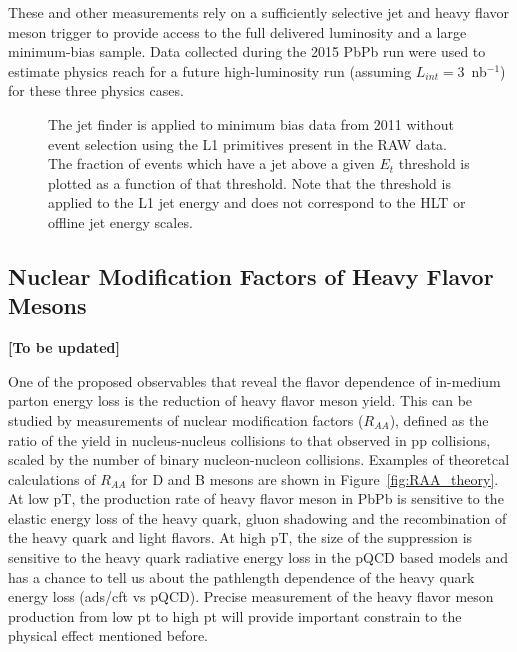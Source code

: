 These and other measurements rely on a sufficiently selective jet and heavy flavor meson trigger to provide access to the 
full delivered luminosity and a large minimum-bias sample.  Data collected during the 2015 PbPb run were used to estimate physics reach  
for a future high-luminosity run (assuming $L_{int} =$3~nb$^{-1}$) for these three physics cases. 

\begin{figure}[!ht]
\begin{center}
\caption{The jet finder is applied to minimum bias data from 2011 without
event selection using the L1 primitives present in the RAW data. The
fraction of events which have a jet above a given $E_t$ threshold is plotted
as a function of that threshold. Note that the threshold is applied to the
L1 jet energy and does not correspond to the HLT or offline jet energy
scales.}
\label{fig:efficiency_comparison}
\end{center}
\end{figure}


\subsection{Nuclear Modification Factors of Heavy Flavor Mesons}
{\bf [To be updated]}

One of the proposed observables that reveal the flavor dependence of in-medium parton energy loss is the reduction of heavy flavor meson yield. This can be studied by measurements of nuclear modification factors ($R_{AA}$), defined as the ratio of the yield in nucleus-nucleus collisions to that observed in pp collisions, scaled by the number of binary nucleon-nucleon collisions. Examples of theoretcal calculations of $R_{AA}$ for D and B mesons are shown in Figure~\ref{fig:RAA_theory}. At low pT, the production rate of heavy flavor meson in PbPb is sensitive to the elastic energy loss of the heavy quark, gluon shadowing and the recombination of the heavy quark and light flavors. At high pT, the size of the suppression is sensitive to the heavy quark radiative energy loss in the pQCD based models and has a chance to tell us about the pathlength dependence of the heavy quark energy loss (ads/cft vs pQCD). Precise measurement of the heavy flavor meson production from low pt to high pt will provide important constrain to the physical effect mentioned before.

